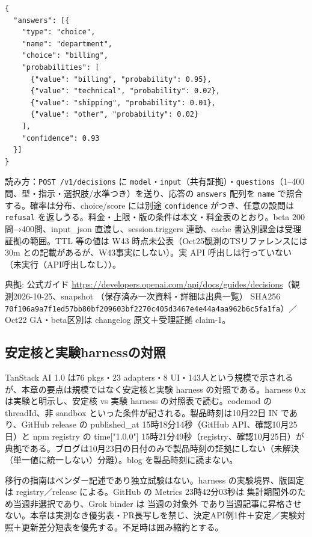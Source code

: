 \documentclass[lualatex,a4paper,10pt]{jlreq}
\begin{document}
\begin{verbatim}
{
  "answers": [{
    "type": "choice",
    "name": "department",
    "choice": "billing",
    "probabilities": [
      {"value": "billing", "probability": 0.95},
      {"value": "technical", "probability": 0.02},
      {"value": "shipping", "probability": 0.01},
      {"value": "other", "probability": 0.02}
    ],
    "confidence": 0.93
  }]
}
\end{verbatim}


読み方：\texttt{POST /v1/decisions} に \texttt{model}・\texttt{input}（共有証拠）・\texttt{questions}（1–400問、型・指示・選択肢/水準つき）を送り、応答の \texttt{answers} 配列を \texttt{name} で照合する。確率は分布、choice/score には別途 \texttt{confidence} がつき、任意の設問は \texttt{refusal} を返しうる。料金・上限・版の条件は本文・料金表のとおり。beta 200問→400問、input\_json 直渡し、session.triggers 連動、cache 書込別課金は受理証拠の範囲。TTL 等の値は W43 時点未公表（Oct25観測のTSリファレンスには 30m との記載があるが、W43事実にしない）。実 API 呼出しは行っていない（未実行（API呼出しなし））。

典拠: 公式ガイド \url{https://developers.openai.com/api/docs/guides/decisions}（観測2026-10-25、snapshot （保存済み一次資料・詳細は出典一覧） SHA256 \nolinkurl{70f106a9a7f1ed57bb80bf209603bf2270c405d3467e4e44a4aa962b6c5fa1fa}）／Oct22 GA・beta区別は changelog 原文＋受理証拠 claim-1。


\subsection*{安定核と実験harnessの対照}


TanStack AI 1.0 は76 pkgs・23 adapters・8 UI・143人という規模で示されるが、本章の要点は規模ではなく安定核と実験 harness の対照である。harness 0.x は実験と明示し、安定核 vs 実験 harness の対照表で読む。codemod の threadId、非 sandbox といった条件が記される。製品時刻は10月22日 IN であり、GitHub release の published\_at 15時18分14秒（GitHub API、確認10月25日）と npm registry の time["1.0.0"] 15時21分49秒（registry、確認10月25日）が典拠である。ブログは10月23日の日付のみで製品時刻の証拠にしない（未解決（単一値に統一しない）分離）。blog を製品時刻に読まない。


移行の指南はベンダー記述であり独立試験はない。harness の実験境界、版固定は registry／release による。GitHub の Metrics 23時42分03秒は 集計期間外のため当週非選択であり、Grok binder は 当週の対象外 であり当週記事に昇格させない。本章は実測なき優劣表・PR長写しを禁じ、決定API例1件＋安定／実験対照＋更新差分短表を優先する。不足時は囲み縮約とする。
\end{document}
